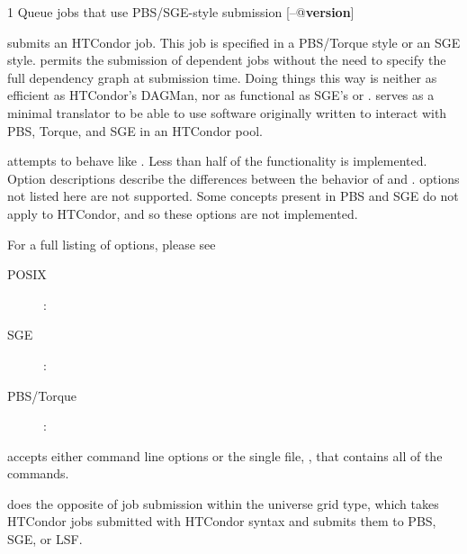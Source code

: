 \begin{ManPage}{\label{man-condor-qsub}}{1}
{Queue jobs that use PBS/SGE-style submission}
\Synopsis {}
[\verb@--@\textbf{version}]


\Description

 submits an HTCondor job.
This job is specified in a PBS/Torque style or an SGE style.
 permits the 
submission of dependent jobs without the need to specify the full
dependency graph at submission time.
Doing things this way is neither as efficient
as HTCondor's DAGMan, nor as functional as SGE's  or .
 serves as a minimal translator to be able to use 
software originally written to interact 
with PBS, Torque, and SGE in an HTCondor pool. 

 attempts to behave like . 
Less than half of the 
functionality is implemented. 
Option descriptions 
describe the differences between the behavior of  and 
.
 options not listed here are not supported.
Some concepts present in PBS and SGE do not apply to HTCondor,
and so these options are not implemented.

For a full listing of  options, please see
\begin{description}
\item[POSIX]: 
\item[SGE]: 
\item[PBS/Torque]: 
\end{description}

 accepts
either command line options or the single file, ,
that contains all of the commands. 

 does the opposite of job submission within the 
 universe 
 grid type,
which takes HTCondor jobs submitted with HTCondor
syntax and submits them to PBS, SGE, or LSF.


\end{ManPage}
